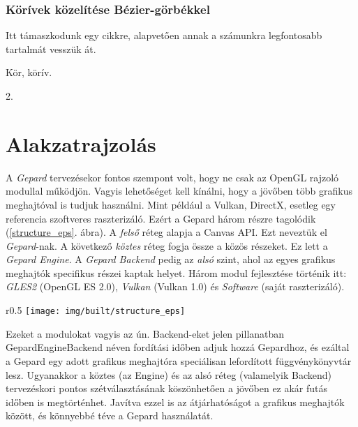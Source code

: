 \documentclass[12pt]{report}
\theoremstyle{definition}
\newcommand{\func}[1]{{\textsf{\footnotesize{#1}}}}
\newcommand{\melyikoldalra}{r}
\begin{document}
    \subsection*{Körívek közelítése Bézier-görbékkel}
    \label{}

Itt támaszkodunk egy cikkre, alapvetően annak a számunkra legfontosabb
tartalmát vesszük át.

  \begin{description}[noitemsep]
    \item[Kulcsszavak] Kör, körív.
    \item[Becsült oldalszám] 2.
  \end{description}


    \chapter{Alakzatrajzolás}

A \emph{Gepard} tervezésekor fontos szempont volt, hogy ne csak az OpenGL
rajzoló modullal működjön. Vagyis lehetőséget kell kínálni, hogy a jövőben több
grafikus meghajtóval is tudjuk használni. Mint például a Vulkan, DirectX,
esetleg egy referencia szoftveres raszterizáló. Ezért a Gepard három részre
tagolódik (\ref{structure_eps}. ábra). A \emph{felső} réteg alapja a Canvas
API. Ezt neveztük el \emph{Gepard}-nak. A következő \emph{köztes} réteg fogja
össze a közös részeket. Ez lett a \emph{Gepard Engine}. A \emph{Gepard Backend}
pedig az \emph{alsó} szint, ahol az egyes grafikus meghajtók specifikus részei
kaptak helyet. Három modul fejlesztése történik itt: \emph{GLES2} (OpenGL ES
2.0), \emph{Vulkan} (Vulkan 1.0) és \emph{Software} (saját raszterizáló).
    \begin{wrapfigure}{\melyikoldalra}{0.5\textwidth}
      \texttt{[image: img/built/structure\_eps]}
      \caption{\label{structure_eps} A három fő réteg}
    \end{wrapfigure}
Ezeket a modulokat vagyis az ún. Backend-eket jelen pillanatban
\func{GepardEngineBackend} néven fordítási időben adjuk hozzá Gepardhoz, és
ezáltal a Gepard egy adott grafikus meghajtóra speciálisan lefordított
függvénykönyvtár lesz. Ugyanakkor a köztes (az Engine) és az alsó réteg
(valamelyik Backend) tervezéskori pontos szétválasztásának köszönhetően a
jövőben ez akár futás időben is megtörténhet. Javítva ezzel is az
átjárhatóságot a grafikus meghajtók között, és könnyebbé téve a
Gepard használatát.
\end{document}
